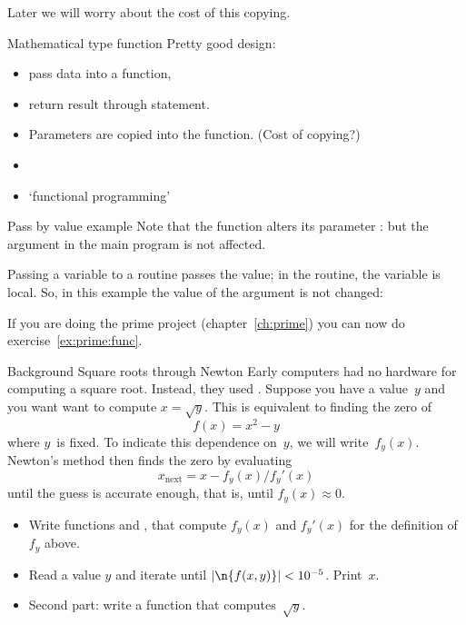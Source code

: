 Later we will worry about the cost of this copying.

\begin{slide}{Mathematical type function}
  \label{sl:func-functional}
  Pretty good design:
  \begin{itemize}
  \item pass data into a function,
  \item return result through  statement.
  \item Parameters are copied into the function. (Cost of copying?)
  \item {}
  \item `functional programming'
  \end{itemize}
\end{slide}

\begin{slide}{Pass by value example}
  \label{sl:func-functional-ex}
  Note that the function alters its parameter :
  but the argument in the main program is not affected.
\end{slide}

Passing a variable to a routine passes the value; in the routine, the
variable is local. So, in this example
the value of the argument is not changed:


\begin{exercise}
If you are doing the prime project (chapter~\ref{ch:prime}) you can
now do exercise~\ref{ex:prime:func}.
\end{exercise}

\begin{block}{Background Square roots through Newton}
  \label{sl:newton-root}
  Early computers had no hardware for computing a square
  root. Instead, they used . Suppose you
  have a value~$y$ and you want want to compute
  $x=\sqrt{y}$. This is equivalent to finding the zero of
  \[ f(x) = x^2-y \] where $y$~is fixed. To indicate this dependence
  on~$y$, we will write~$f_y(x)$. Newton's method then finds the zero by
  evaluating
  \[ x_{\mathrm{next}}=x-f_y(x)/f_y'(x) \]
  until the guess is accurate enough, that is, until $f_y(x)\approx0$.
\end{block}

\begin{exercise}
  \label{ex:newton-root}
  \begin{itemize}
  \item Write functions  and , that compute
    $f_y(x)$ and $f_y'(x)$ for the definition of $f_y$ above.
  \item Read a value $y$ and iterate until $|\n{f(x,y)}|<10^{-5}$. Print~$x$.
  \item Second part: write a function  that computes~$\sqrt{y}$.
  \end{itemize}
\end{exercise}

